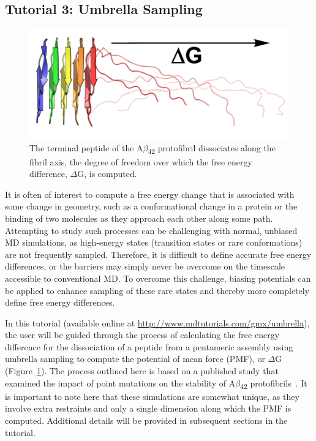 \documentclass[9pt,tutorial,pubversion]{livecoms}
\newcommand{\urlstring}{http://www.mdtutorials.com/gmx}
\newcommand{\tutorialpmf}{\url{\urlstring/umbrella}}
\begin{document}
\subsection{Tutorial 3: Umbrella Sampling} \label{pmf}

\begin{figure}[h]
\centering
\includegraphics{umbrella_protofibril_dissociate}
\caption{The terminal peptide of the A$\beta$\textsubscript{42} protofibril dissociates along the fibril axis, the degree of freedom over which the free energy difference, $\Delta$G, is computed.}
\label{umbrella_composite_fig}
\end{figure}

It is often of interest to compute a free energy change that is associated with some change in geometry, such as a conformational change in a protein or the binding of two molecules as they approach each other along some path. Attempting to study such processes can be challenging with normal, unbiased MD simulations, as high-energy states (transition states or rare conformations) are not frequently sampled. Therefore, it is difficult to define accurate free energy differences, or the barriers may simply never be overcome on the timescale accessible to conventional MD. To overcome this challenge, biasing potentials can be applied to enhance sampling of these rare states and thereby more completely define free energy differences.

In this tutorial (available online at \tutorialpmf), the user will be guided through the process of calculating the free energy difference for the dissociation of a peptide from a pentameric assembly using umbrella sampling to compute the potential of mean force (PMF), or $\Delta$G (Figure~\ref{umbrella_composite_fig}). The process outlined here is based on a published study that examined the impact of point mutations on the stability of A$\beta$\textsubscript{42} protofibrils~\cite{Lemkul2010}. It is important to note here that these simulations are somewhat unique, as they involve extra restraints and only a single dimension along which the PMF is computed. Additional details will be provided in subsequent sections in the tutorial.
\end{document}
